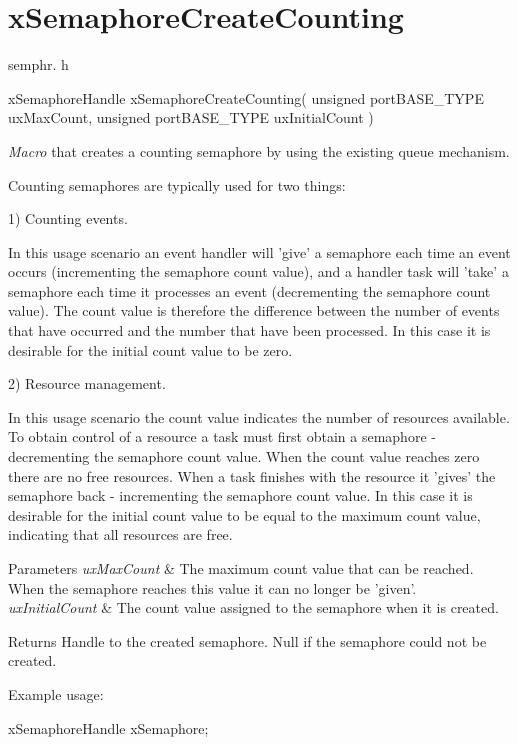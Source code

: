 \hypertarget{group__x_semaphore_create_counting}{\section{x\-Semaphore\-Create\-Counting}
\label{group__x_semaphore_create_counting}
}
semphr. h 
\begin{DoxyPre}xSemaphoreHandle xSemaphoreCreateCounting( unsigned portBASE\_TYPE uxMaxCount, unsigned portBASE\_TYPE uxInitialCount )\end{DoxyPre}


{\itshape Macro} that creates a counting semaphore by using the existing queue mechanism.

Counting semaphores are typically used for two things\-:

1) Counting events.

In this usage scenario an event handler will 'give' a semaphore each time an event occurs (incrementing the semaphore count value), and a handler task will 'take' a semaphore each time it processes an event (decrementing the semaphore count value). The count value is therefore the difference between the number of events that have occurred and the number that have been processed. In this case it is desirable for the initial count value to be zero.

2) Resource management.

In this usage scenario the count value indicates the number of resources available. To obtain control of a resource a task must first obtain a semaphore -\/ decrementing the semaphore count value. When the count value reaches zero there are no free resources. When a task finishes with the resource it 'gives' the semaphore back -\/ incrementing the semaphore count value. In this case it is desirable for the initial count value to be equal to the maximum count value, indicating that all resources are free.


\begin{DoxyParams}{Parameters}
{\em ux\-Max\-Count} & The maximum count value that can be reached. When the semaphore reaches this value it can no longer be 'given'.\\
\hline
{\em ux\-Initial\-Count} & The count value assigned to the semaphore when it is created.\\
\hline
\end{DoxyParams}
\begin{DoxyReturn}{Returns}
Handle to the created semaphore. Null if the semaphore could not be created.
\end{DoxyReturn}
Example usage\-: 
\begin{DoxyPre}
 xSemaphoreHandle xSemaphore;\end{DoxyPre}



